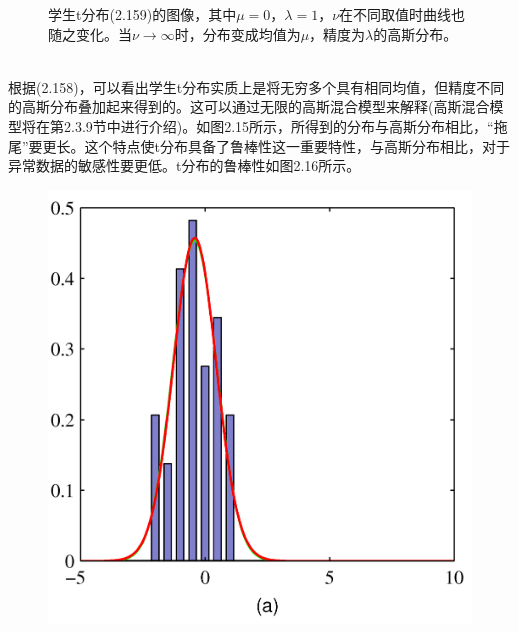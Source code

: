 \documentclass[b5paper]{book}
\numberwithin{equation}{chapter}
\begin{document}
{\begin{figure}[ht]
		\caption{学生t分布(2.159)的图像，其中$\mu=0$，$\lambda=1$，$\nu$在不同取值时曲线也随之变化。当$\nu \rightarrow \infty$时，分布变成均值为$\mu$，精度为$\lambda$的高斯分布。}
		\label{fig:2-15}
	\end{figure}
	\\
	\indent 根据(2.158)，可以看出学生t分布实质上是将无穷多个具有相同均值，但精度不同的高斯分布叠加起来得到的。这可以通过无限的高斯混合模型来解释(高斯混合模型将在第2.3.9节中进行介绍)。如图2.15所示，所得到的分布与高斯分布相比，“拖尾”要更长。这个特点使t分布具备了鲁棒性这一重要特性，与高斯分布相比，对于异常数据的敏感性要更低。t分布的鲁棒性如图2.16所示。
	\begin{figure}[ht]
		\begin{minipage}[t]{0.5\linewidth}
		\centering
		\includegraphics[scale=0.8]{Images/2-16a.png}
		\label{fig:2-16a}
		\end{minipage}
		\begin{minipage}[t]{0.5\linewidth}
		\centering

\end{minipage}
\end{figure}}
\end{document}
